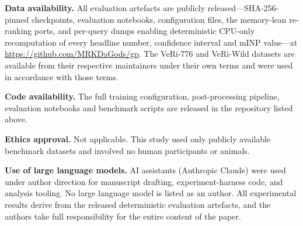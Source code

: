 \documentclass[10pt,a4paper]{article}
\begin{document}
\medskip\noindent\textbf{Data availability.} All evaluation artefacts are
publicly released---SHA-256-pinned checkpoints, evaluation notebooks,
configuration files, the memory-lean re-ranking ports, and per-query dumps
enabling deterministic CPU-only recomputation of every headline number,
confidence interval and mINP value---at
\url{https://github.com/MRKDaGods/gp}. The VeRi-776 and VeRi-Wild datasets are
available from their respective maintainers under their own terms and were used
in accordance with those terms.

\medskip\noindent\textbf{Code availability.} The full training configuration,
post-processing pipeline, evaluation notebooks and benchmark scripts are
released in the repository listed above.

\medskip\noindent\textbf{Ethics approval.} Not applicable. This study used only
publicly available benchmark datasets and involved no human participants or
animals.

\medskip\noindent\textbf{Use of large language models.} AI assistants
(Anthropic Claude) were used under author direction for manuscript drafting,
experiment-harness code, and analysis tooling. No large language model is
listed as an author. All experimental results derive from the released
deterministic evaluation artefacts, and the authors take full responsibility
for the entire content of the paper.

%   
%   
\end{document}
